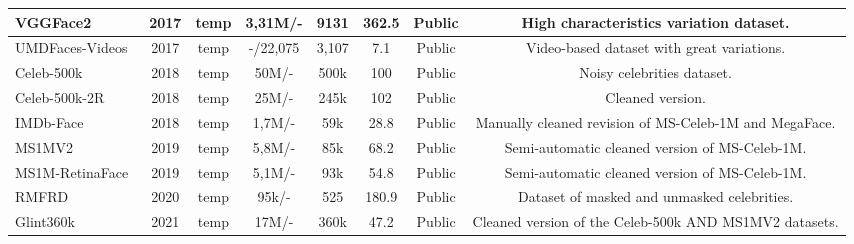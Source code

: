 \documentclass[class=report, crop=false, a4paper, 12pt]{standalone}
\begin{document}
\begin{table}[!ht]
{\begin{tabular}{|l|c|c|c|c|c|c|c|}
    VGGFace2~\autocite{caoVGGFace2DatasetRecognising2018}                               & 2017          & temp                  & 3,31M/-                & 9131           & 362.5                 & Public                & High characteristics variation dataset.                 \\ \hline
    UMDFaces-Videos~\autocite{bansalDonTsCNNbased2017}                        & 2017          & temp                  & -/22,075               & 3,107          & 7.1                   & Public                & Video-based dataset with great variations.                 \\ \hline
    Celeb-500k~\autocite{caoCeleb500KLargeTraining2018}                             & 2018          & temp                  & 50M/-                  & 500k           & 100                   & Public                & Noisy celebrities dataset.                 \\ \hline
    Celeb-500k-2R~\autocite{caoCeleb500KLargeTraining2018}                          & 2018          & temp                  & 25M/-                  & 245k           & 102                   & Public                & Cleaned version.                 \\ \hline
    IMDb-Face~\autocite{wangDevilFaceRecognition2018}                              & 2018          & temp                  & 1,7M/-                 & 59k            & 28.8                  & Public                & Manually cleaned revision of MS-Celeb-1M and MegaFace.                 \\ \hline
    MS1MV2~\autocite{dengArcFaceAdditiveAngular}                                 & 2019          & temp                  & 5,8M/-                 & 85k            & 68.2                  & Public                & Semi-automatic cleaned version of MS-Celeb-1M.                 \\ \hline
    MS1M-RetinaFace~\autocite{dengLightweightFaceRecognition2019}                                 & 2019          & temp                  & 5,1M/-                 & 93k            & 54.8                  & Public                & Semi-automatic cleaned version of MS-Celeb-1M.                 \\ \hline
    RMFRD~\autocite{wangMaskedFaceRecognition2020}                                 & 2020          & temp                  & 95k/-                  & 525            & 180.9                 & Public                & Dataset of masked and unmasked celebrities.                 \\ \hline
    Glint360k~\autocite{anPartialFCTraining2021}                              & 2021          & temp                  & 17M/-                  & 360k           & 47.2                  & Public                & Cleaned version of the Celeb-500k AND MS1MV2 datasets.                \\ \hline

\end{tabular}}
\end{table}
\end{document}
